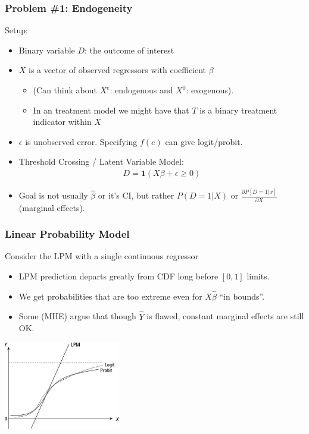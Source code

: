 \documentclass[aspectratio=169]{beamer}
\begin{document}
\begin{frame}
\frametitle{Problem \#1: Endogeneity}
Setup:
\begin{itemize}
\item Binary variable $D$: the outcome of interest
\item $X$ is a vector of observed regressors with coefficient $\beta$ 
\begin{itemize}
\item (Can think about $X^e$: endogenous and $X^0$: exogenous).
\item In an treatment model we might have that $T$ is a binary treatment indicator within $X$
\end{itemize}
\item $\epsilon$ is unobserved error. Specifying $f(e)$ can give logit/probit.
\item Threshold Crossing / Latent Variable Model:
\begin{eqnarray*}
D = \mathbf{1}(X \beta + \epsilon \geq 0)
\end{eqnarray*}
\item Goal is not usually $\hat{\beta}$ or it's CI, but rather $P(D=1 | X)$ or $\frac{\partial P[D=1 | x] }{\partial X}$ (marginal effects).
\end{itemize}
\end{frame}


\begin{frame}
\frametitle{Linear Probability Model}
Consider the LPM with a single continuous regressor
\begin{itemize}
\item LPM prediction departs greatly from CDF long before $[0,1]$ limits.
\item We get probabilities that are too extreme even for $X\hat{\beta}$ ``in bounds''.
\item Some (MHE) argue that though $\hat{Y}$ is flawed, constant marginal effects are still OK.
\end{itemize}
\begin{center}
\includegraphics[width=2in]{resources/lpm-probit.jpg}
\end{center}
\end{frame}
\end{document}
